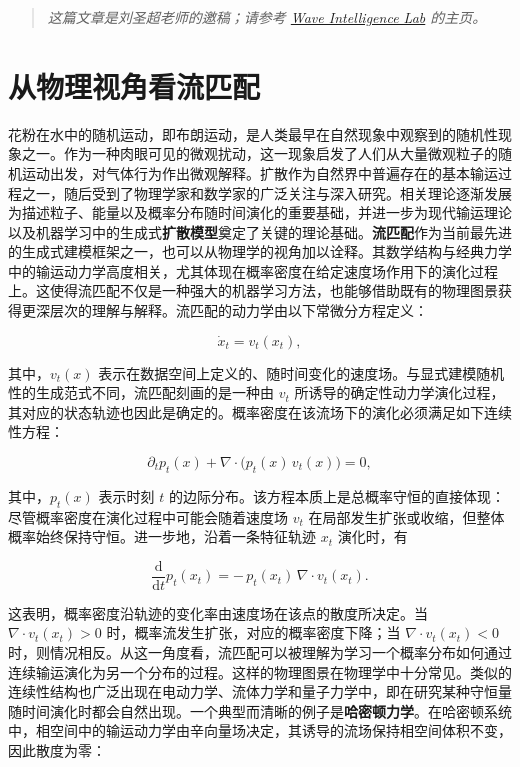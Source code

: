 \begin{quote}\emph{这篇文章是刘圣超老师的邀稿；请参考 \href{http://waveintell.ai/blog/}{Wave Intelligence Lab} 的主页。}\end{quote}

\section{从物理视角看流匹配}

花粉在水中的随机运动，即布朗运动，是人类最早在自然现象中观察到的随机性现象之一。作为一种肉眼可见的微观扰动，这一现象启发了人们从大量微观粒子的随机运动出发，对气体行为作出微观解释。扩散作为自然界中普遍存在的基本输运过程之一，随后受到了物理学家和数学家的广泛关注与深入研究。相关理论逐渐发展为描述粒子、能量以及概率分布随时间演化的重要基础，并进一步为现代输运理论以及机器学习中的生成式\textbf{扩散模型}奠定了关键的理论基础。\textbf{流匹配}作为当前最先进的生成式建模框架之一，也可以从物理学的视角加以诠释。其数学结构与经典力学中的输运动力学高度相关，尤其体现在概率密度在给定速度场作用下的演化过程上。这使得流匹配不仅是一种强大的机器学习方法，也能够借助既有的物理图景获得更深层次的理解与解释。流匹配的动力学由以下常微分方程定义：

\[
\dot{x}_t = v_t(x_t),
\]

其中，\(v_t(x)\) 表示在数据空间上定义的、随时间变化的速度场。与显式建模随机性的生成范式不同，流匹配刻画的是一种由 \(v_t\) 所诱导的确定性动力学演化过程，其对应的状态轨迹也因此是确定的。概率密度在该流场下的演化必须满足如下连续性方程：

\[
\partial_t p_t(x) + \nabla \cdot \bigl(p_t(x)\, v_t(x)\bigr) = 0,
\label{keyeq:flow-continuity}
\]

其中，\(p_t(x)\) 表示时刻 \(t\) 的边际分布。该方程本质上是总概率守恒的直接体现：尽管概率密度在演化过程中可能会随着速度场 \(v_t\) 在局部发生扩张或收缩，但整体概率始终保持守恒。进一步地，沿着一条特征轨迹 \(x_t\) 演化时，有

\[
\frac{\mathrm{d}}{\mathrm{d}t} p_t(x_t)
=
-\, p_t(x_t)\, \nabla \cdot v_t(x_t).
\]

这表明，概率密度沿轨迹的变化率由速度场在该点的散度所决定。当 \(\nabla \cdot v_t(x_t) > 0\) 时，概率流发生扩张，对应的概率密度下降；当 \(\nabla \cdot v_t(x_t) < 0\) 时，则情况相反。从这一角度看，流匹配可以被理解为学习一个概率分布如何通过连续输运演化为另一个分布的过程。这样的物理图景在物理学中十分常见。类似的连续性结构也广泛出现在电动力学、流体力学和量子力学中，即在研究某种守恒量随时间演化时都会自然出现。一个典型而清晰的例子是\textbf{哈密顿力学}。在哈密顿系统中，相空间中的输运动力学由辛向量场决定，其诱导的流场保持相空间体积不变，因此散度为零：

